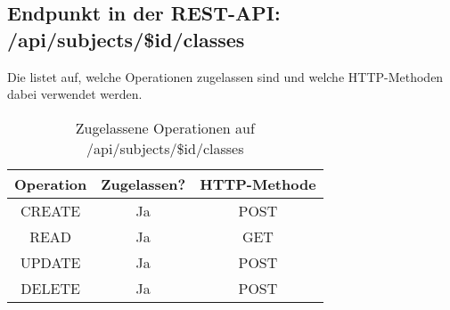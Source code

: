 \subsection{Endpunkt in der REST-API: /api/subjects/\$id/classes}
Die  listet auf, welche Operationen zugelassen sind und welche HTTP-Methoden dabei verwendet werden. 

\begin{table}[!htbp]
	\begin{tabular}{|c|c|c|}
		\hline
			\textbf{Operation} & \textbf{Zugelassen?} & \textbf{HTTP-Methode} \\ \hline
			CREATE & Ja & POST \\ \hline 
			READ & Ja & GET \\ \hline
			UPDATE & Ja & POST \\ \hline 
			DELETE & Ja & POST \\ \hline
	\end{tabular}

		\caption{Zugelassene Operationen auf /api/subjects/\$id/classes}
		\label{tab:rest:api:subjects:id:classes:meth}
\end{table}

